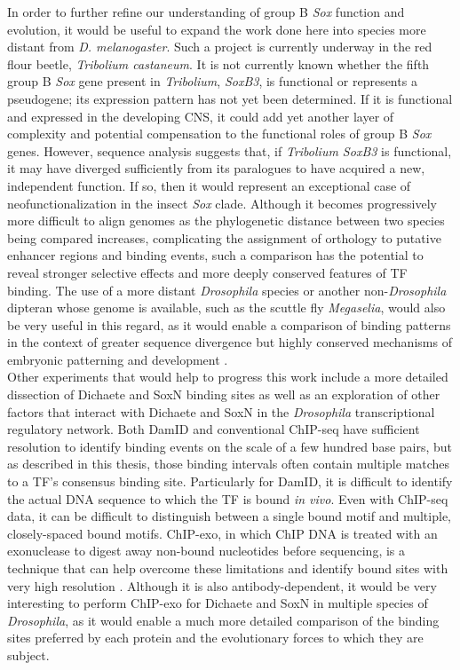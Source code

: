 In order to further refine our understanding of group B \emph{Sox} function and evolution, it would be useful to expand the work done here into species more distant from \emph{D. melanogaster}. Such a project is currently underway in the red flour beetle, \emph{Tribolium castaneum}. It is not currently known whether the fifth group B \emph{Sox} gene present in \emph{Tribolium}, \emph{SoxB3}, is functional or represents a pseudogene; its expression pattern has not yet been determined. If it is functional and expressed in the developing CNS, it could add yet another layer of complexity and potential compensation to the functional roles of group B \emph{Sox} genes. However, sequence analysis suggests that, if \emph{Tribolium SoxB3} is functional, it may have diverged sufficiently from its paralogues to have acquired a new, independent function. If so, then it would represent an exceptional case of neofunctionalization in the insect \emph{Sox} clade. Although it becomes progressively more difficult to align genomes as the phylogenetic distance between two species being compared increases, complicating the assignment of orthology to putative enhancer regions and binding events, such a comparison has the potential to reveal stronger selective effects and more deeply conserved features of TF binding. The use of a more distant \emph{Drosophila} species or another non-\emph{Drosophila} dipteran whose genome is available, such as the scuttle fly \emph{Megaselia}, would also be very useful in this regard, as it would enable a comparison of binding patterns in the context of greater sequence divergence but highly conserved mechanisms of embryonic patterning and development \citep{hare_sepsid_2008}.\\

Other experiments that would help to progress this work include a more detailed dissection of Dichaete and SoxN binding sites as well as an exploration of other factors that interact with Dichaete and SoxN in the \emph{Drosophila} transcriptional regulatory network. Both DamID and conventional ChIP-seq have sufficient resolution to identify binding events on the scale of a few hundred base pairs, but as described in this thesis, those binding intervals often contain multiple matches to a TF's consensus binding site. Particularly for DamID, it is difficult to identify the actual DNA sequence to which the TF is bound \emph{in vivo}. Even with ChIP-seq data, it can be difficult to distinguish between a single bound motif and multiple, closely-spaced bound motifs. ChIP-exo, in which ChIP DNA is treated with an exonuclease to digest away non-bound nucleotides before sequencing, is a technique that can help overcome these limitations and identify bound sites with very high resolution \citep{bardet_identification_2013,rhee_comprehensive_2011}. Although it is also antibody-dependent, it would be very interesting to perform ChIP-exo for Dichaete and SoxN in multiple species of \emph{Drosophila}, as it would enable a much more detailed comparison of the binding sites preferred by each protein and the evolutionary forces to which they are subject.

